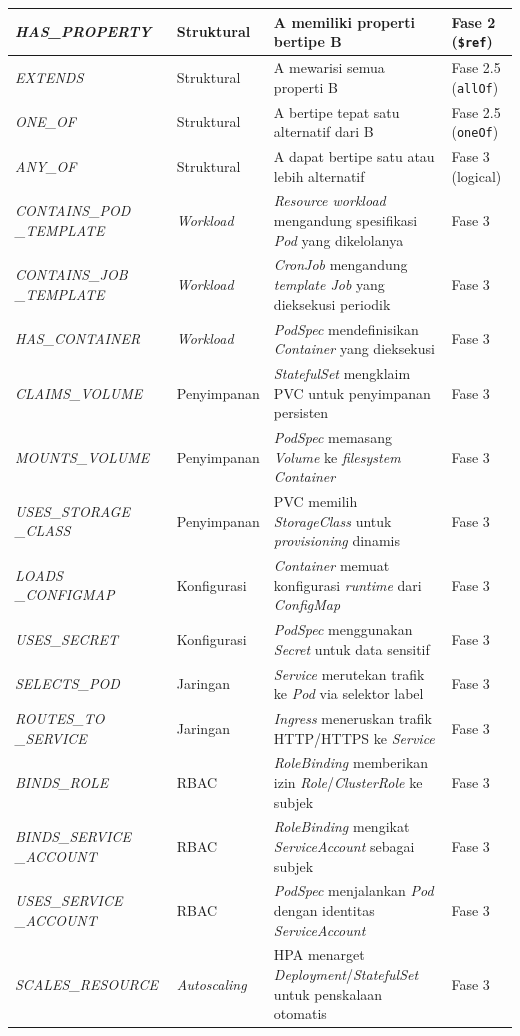\begin{longtable}{ p{} p{} p{} p{} }
\textit{HAS\_PROPERTY} & Struktural & A memiliki properti bertipe B & Fase 2 (\texttt{\$ref}) \\
\hline
\textit{EXTENDS} & Struktural & A mewarisi semua properti B & Fase 2.5 (\texttt{allOf}) \\
\hline
\textit{ONE\_OF} & Struktural & A bertipe tepat satu alternatif dari B & Fase 2.5 (\texttt{oneOf}) \\
\hline
\textit{ANY\_OF} & Struktural & A dapat bertipe satu atau lebih alternatif & Fase 3 (logical) \\
\hline
\textit{CONTAINS\_POD \_TEMPLATE} & \textit{Workload} & \textit{Resource workload} mengandung spesifikasi \textit{Pod} yang dikelolanya & Fase 3 \\
\hline
\textit{CONTAINS\_JOB \_TEMPLATE} & \textit{Workload} & \textit{CronJob} mengandung \textit{template Job} yang dieksekusi periodik & Fase 3 \\
\hline
\textit{HAS\_CONTAINER} & \textit{Workload} & \textit{PodSpec} mendefinisikan \textit{Container} yang dieksekusi & Fase 3 \\
\hline
\textit{CLAIMS\_VOLUME} & Penyimpanan & \textit{StatefulSet} mengklaim PVC untuk penyimpanan persisten & Fase 3 \\
\hline
\textit{MOUNTS\_VOLUME} & Penyimpanan & \textit{PodSpec} memasang \textit{Volume} ke \textit{filesystem Container} & Fase 3 \\
\hline
\textit{USES\_STORAGE \_CLASS} & Penyimpanan & PVC memilih \textit{StorageClass} untuk \textit{provisioning} dinamis & Fase 3 \\
\hline
\textit{LOADS \_CONFIGMAP} & Konfigurasi & \textit{Container} memuat konfigurasi \textit{runtime} dari \textit{ConfigMap} & Fase 3 \\
\hline
\textit{USES\_SECRET} & Konfigurasi & \textit{PodSpec} menggunakan \textit{Secret} untuk data sensitif & Fase 3 \\
\hline
\textit{SELECTS\_POD} & Jaringan & \textit{Service} merutekan trafik ke \textit{Pod} via selektor label & Fase 3 \\
\hline
\textit{ROUTES\_TO \_SERVICE} & Jaringan & \textit{Ingress} meneruskan trafik HTTP/HTTPS ke \textit{Service} & Fase 3 \\
\hline
\textit{BINDS\_ROLE} & RBAC & \textit{RoleBinding} memberikan izin \textit{Role}/\textit{ClusterRole} ke subjek & Fase 3 \\
\hline
\textit{BINDS\_SERVICE \_ACCOUNT} & RBAC & \textit{RoleBinding} mengikat \textit{ServiceAccount} sebagai subjek & Fase 3 \\
\hline
\textit{USES\_SERVICE \_ACCOUNT} & RBAC & \textit{PodSpec} menjalankan \textit{Pod} dengan identitas \textit{ServiceAccount} & Fase 3 \\
\hline
\textit{SCALES\_RESOURCE} & \textit{Autoscaling} & HPA menarget \textit{Deployment}/\textit{StatefulSet} untuk penskalaan otomatis & Fase 3 \\
\hline

\end{longtable}
